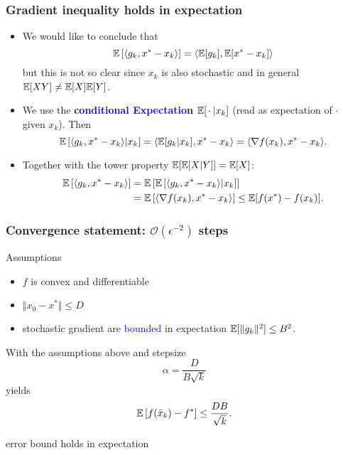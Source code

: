 \documentclass[aspectratio=149]{beamer}
\begin{document}
\begin{frame}
  \frametitle{Gradient inequality holds in expectation}

  \begin{itemize}
    \item We would like to conclude that
          \begin{equation}
            \mathbb{E} \left[ \langle g_k, x^*-x_k \rangle\right] = \langle \mathbb{E}[g_k], \mathbb{E}[x^*-x_k] \rangle
          \end{equation}
          but this is not so clear since $x_k$ is also stochastic and in general $\mathbb{E}[XY]\neq \mathbb{E}[X]\mathbb{E}[Y]$.

    \item We use the \textcolor{blue}{\textbf{conditional Expectation}} $\mathbb{E}[\, \cdot \, | x_k]$ (read as expectation of $\cdot$ given $x_k$). Then
          \begin{equation}
            \mathbb{E} \left[ \langle g_k, x^*-x_k \rangle | x_k \right] = \langle \mathbb{E}[g_k | x_k], x^*-x_k \rangle = \langle \nabla f(x_k), x^*-x_k \rangle.
          \end{equation}
    \item Together with the tower property $\mathbb{E}[\mathbb{E}[X|Y]]= \mathbb{E}[X]$:
          \begin{align}
            \mathbb{E} \left[ \langle g_k, x^*-x_k \rangle \right] &= \mathbb{E}\left[\mathbb{E} \left[ \langle g_k, x^*-x_k \rangle | x_k \right] \right] \\
                                               &= \mathbb{E}\left[\langle \nabla f(x_k), x^*-x_k \rangle \right] \le \mathbb{E}[ f(x^*) - f(x_k) ].
          \end{align}

  \end{itemize}

\end{frame}


\begin{frame}
  \frametitle{Convergence statement: $\mathcal{O}(\epsilon^{-2})$ steps}
  \begin{block}{Assumptions}
    \begin{itemize}
      \item $f$ is convex and differentiable
      \item $\Vert x_0-x^* \Vert \le D$
      \item stochastic gradient are \textcolor{blue}{bounded} in expectation $\mathbb{E}[\Vert g_k \Vert^2] \le B^2$.
    \end{itemize}
  \end{block}
  \begin{theorem}
    With the assumptions above and stepsize
    \begin{equation}
      \alpha = \frac{D}{B \sqrt{k}}
    \end{equation}
    yields
    \begin{equation}
      \mathbb{E} \left[ f(\bar{x}_k) - f^*\right] \le \frac{DB}{\sqrt{k}}.
    \end{equation}
  \end{theorem}
  error bound holds in expectation

\end{frame}
\end{document}
